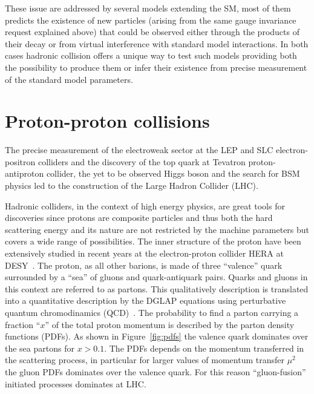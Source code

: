 These issue are addressed by several models extending the SM, most of them predicts the existence of new particles
(arising from the same gauge invariance request explained above) that could be observed either through the
products of their decay or from virtual interference with standard model interactions.
In both cases hadronic collision offers a unique way to test such models providing both the possibility
to produce them or infer their existence from precise measurement of the standard model parameters.

\section{Proton-proton collisions}
The precise measurement of the electroweak sector at the LEP and SLC electron-positron colliders and the discovery of the top
quark at Tevatron proton-antiproton collider, the yet to be observed Higgs boson and the search for BSM physics led
to the construction of the Large Hadron Collider (LHC).

Hadronic colliders, in the context of high energy physics, are great tools for discoveries since
protons are composite particles and thus both the hard scattering energy and its nature are not restricted by
the machine parameters but covers a wide range of possibilities.
The inner structure of the proton have been extensively studied in recent years at the electron-proton collider HERA
at DESY~\cite{hera}. The proton, as all other barions, is made of three ``valence'' quark surrounded by a ``sea''
of gluons and quark-antiquark pairs. Quarks and gluons in this context are referred to as partons. 
This qualitatively description is translated into a quantitative description by the DGLAP equations using perturbative
quantum chromodinamics (QCD)~\cite{altarelli_parisi,gribov,dokshitzer}.
The probability to find a parton carrying a fraction ``$x$'' of the total proton momentum
is described by the parton density functions (PDFs).
As shown in Figure~\ref{fig:pdfs} the valence quark dominates over the sea partons for $x>0.1$.
The PDFs depends on the momentum transferred in the scattering process, in particular for
larger values of momentum transfer $\mu^2$ the gluon PDFs dominates over the valence quark. For this reason
``gluon-fusion'' initiated processes dominates at LHC.


